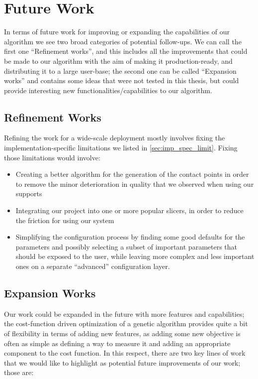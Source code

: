 \section{Future Work}
\label{sec:future_work}

In terms of future work for improving or expanding the capabilities of our algorithm
we see two broad categories of potential follow-ups. We can call the first one
``Refinement works'', and this includes all the improvements that could
be made to our algorithm with the aim of making it production-ready, and
distributing it to a large user-base; the second one can be called ``Expansion works''
and contains some ideas that were not tested in this thesis, but could provide interesting
new functionalities/capabilities to our algorithm.

\subsection{Refinement Works}
Refining the work for a wide-scale deployment mostly involves fixing
the implementation-specific limitations we listed in \cref{sec:imp_spec_limit}.
Fixing those limitations would involve:
\begin{itemize}
    \item Creating a better algorithm for the generation
of the contact points in order to remove the minor deterioration in quality that we observed when
using our supports
    \item Integrating our project into one or more popular slicers,
in order to reduce the friction for using our system
    \item Simplifying the configuration process by finding some good defaults for the parameters
and possibly selecting a subset of important parameters that should be exposed to the user,
while leaving more complex and less important ones on a separate ``advanced'' configuration layer.
\end{itemize} 

\subsection{Expansion Works}

Our work could be expanded in the future with more features and capabilities; the cost-function
driven optimization of a genetic algorithm provides quite a bit of flexibility in terms
of adding new features, as adding some new objective is often as simple as defining a way to measure it
and adding an appropriate component to the cost function.
In this respect, there are two key lines of work that we would like to highlight as
potential future improvements of our work; those are:

